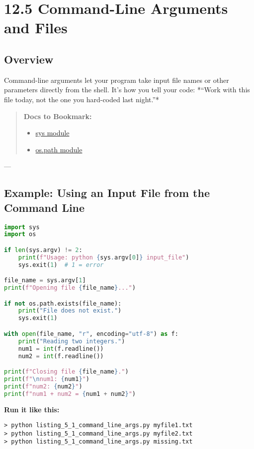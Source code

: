 \chapter{12.5 Command-Line Arguments and Files}

\section*{Overview}
Command-line arguments let your program take input file names or other parameters
directly from the shell.  
It’s how you tell your code: *“Work with this file today, not the one you hard-coded last night.”*

\begin{quote}
\textbf{Docs to Bookmark:}
\begin{itemize}
  \item \href{https://docs.python.org/3/library/sys.html}{sys module}
  \item \href{https://docs.python.org/3/library/os.path.html}{os.path module}
\end{itemize}
\end{quote}

---

\section{Example: Using an Input File from the Command Line}

\begin{lstlisting}[language=Python, caption={listing\_5\_1\_command\_line\_args.py}]
import sys
import os

if len(sys.argv) != 2:
    print(f"Usage: python {sys.argv[0]} input_file")
    sys.exit(1)  # 1 = error

file_name = sys.argv[1]
print(f"Opening file {file_name}...")

if not os.path.exists(file_name):
    print("File does not exist.")
    sys.exit(1)

with open(file_name, "r", encoding="utf-8") as f:
    print("Reading two integers.")
    num1 = int(f.readline())
    num2 = int(f.readline())

print(f"Closing file {file_name}.")
print(f"\nnum1: {num1}")
print(f"num2: {num2}")
print(f"num1 + num2 = {num1 + num2}")
\end{lstlisting}

\noindent
\textbf{Run it like this:}

\begin{verbatim}
> python listing_5_1_command_line_args.py myfile1.txt
> python listing_5_1_command_line_args.py myfile2.txt
> python listing_5_1_command_line_args.py missing.txt
\end{verbatim}

